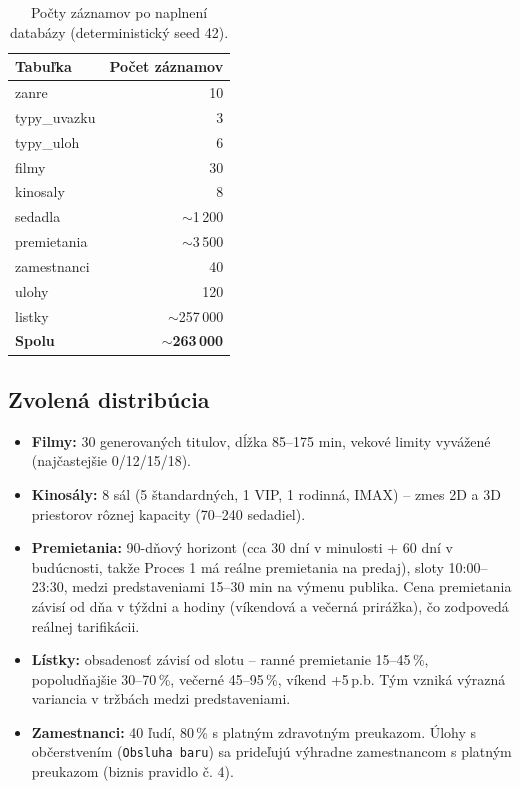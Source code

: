 \documentclass[11pt, a4paper]{article}
\begin{document}
\begin{table}[H]
    \centering
    \begin{tabular}{l r}
        \toprule
        \textbf{Tabuľka} & \textbf{Počet záznamov} \\
        \midrule
        zanre         & 10 \\
        typy\_uvazku  & 3 \\
        typy\_uloh    & 6 \\
        filmy         & 30 \\
        kinosaly      & 8 \\
        sedadla       & $\sim$1\,200 \\
        premietania   & $\sim$3\,500 \\
        zamestnanci   & 40 \\
        ulohy         & 120 \\
        listky        & $\sim$257\,000 \\
        \midrule
        \textbf{Spolu} & \textbf{$\sim$263\,000} \\
        \bottomrule
    \end{tabular}
    \caption{Počty záznamov po naplnení databázy (deterministický seed 42).}
\end{table}

\subsection{Zvolená distribúcia}

\begin{itemize}
    \item \textbf{Filmy:} 30 generovaných titulov, dĺžka 85--175 min,
    vekové limity vyvážené (najčastejšie 0/12/15/18).
    \item \textbf{Kinosály:} 8 sál (5 štandardných, 1 VIP, 1 rodinná, IMAX) --
    zmes 2D a 3D priestorov rôznej kapacity (70--240 sedadiel).
    \item \textbf{Premietania:} 90-dňový horizont (cca 30 dní v minulosti
    + 60 dní v budúcnosti, takže Proces 1 má reálne premietania na predaj),
    sloty 10:00--23:30, medzi predstaveniami 15--30 min na výmenu publika.
    Cena premietania závisí od dňa v týždni a hodiny (víkendová a večerná
    prirážka), čo zodpovedá reálnej tarifikácii.
    \item \textbf{Lístky:} obsadenosť závisí od slotu --
    ranné premietanie 15--45\,\%, popoludňajšie 30--70\,\%,
    večerné 45--95\,\%, víkend +5\,p.b. Tým vzniká výrazná variancia
    v tržbách medzi predstaveniami.
    \item \textbf{Zamestnanci:} 40 ľudí, 80\,\% s platným zdravotným preukazom.
    Úlohy s občerstvením (\texttt{Obsluha baru}) sa prideľujú výhradne
    zamestnancom s platným preukazom (biznis pravidlo č. 4).
\end{itemize}
\end{document}
